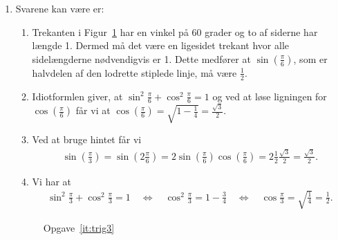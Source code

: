 \begin{enumerate}
	\item \label{it:trig3} Svarene kan være er:

\begin{enumerate}
	\item Trekanten i Figur~\ref{fig:trig3} har en vinkel på $60$ grader og to af siderne har længde 1. Dermed må det være en ligesidet trekant hvor alle sidelængderne nødvendigvis er 1. Dette medfører at $\sin(\frac{\pi}{6})$, som er halvdelen af den lodrette stiplede linje, må være $\frac{1}{2}$.
	
	\item Idiotformlen giver, at $\sin^2 \frac{\pi}{6}+\cos^2\frac{\pi}{6}=1$ og ved at løse ligningen for $\cos(\frac{\pi}{6})$ får vi at $ \cos(\frac{\pi}{6})=\sqrt{1-\frac{1}{4}}=\frac{\sqrt{3}}{2} $.
	
	\item Ved at bruge hintet får vi
	\begin{align*}
	\sin(\frac{\pi}{3})=\sin(2\frac{\pi}{6}) =2\sin(\frac{\pi}{6})\cos(\frac{\pi}{6})=2\frac{1}{2}\frac{\sqrt{3}}{2}=\frac{\sqrt{3}}{2}.
	\end{align*}
	
	\item Vi har at
	\begin{align*}
	\sin^2 \frac{\pi}{3}+ \cos^2\frac{\pi}{3}=1\quad \Leftrightarrow\quad \cos^2\frac{\pi}{3}=1-\frac{3}{4}\quad \Leftrightarrow\quad \cos\frac{\pi}{3}=\sqrt{\frac{1}{4}}=\frac{1}{2}.
	\end{align*}
	
\end{enumerate}

\begin{figure}
	\centering
	\caption{Opgave~\ref{it:trig3}}
	\label{fig:trig3}
\end{figure}


\end{enumerate}
